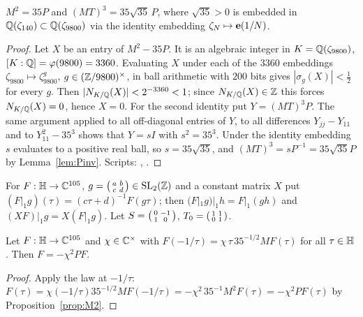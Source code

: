 \begin{proposition}\label{prop:M2}
$M^2=35P$ and $(MT)^3=35\sqrt{35}\,P$, where $\sqrt{35}>0$ is embedded in $\mathbb{Q}(\zeta_{140})\subset\mathbb{Q}(\zeta_{9800})$ via the identity embedding $\zeta_N\mapsto\mathbf{e}(1/N)$.
\end{proposition}
\begin{proof}
Let $X$ be an entry of $M^2-35P$. It is an algebraic integer in $K=\mathbb{Q}(\zeta_{9800})$, $[K:\mathbb{Q}]=\varphi(9800)=3360$. Evaluating $X$ under each of the $3360$ embeddings
$\zeta_{9800}\mapsto\zeta_{9800}^g$, $g\in(\mathbb{Z}/9800)^\times$, in ball arithmetic \cite{Arb} with $200$ bits gives $|\sigma_g(X)|<\frac12$ for every $g$. Then
$|N_{K/\mathbb{Q}}(X)|<2^{-3360}<1$; since $N_{K/\mathbb{Q}}(X)\in\mathbb{Z}$ this forces $N_{K/\mathbb{Q}}(X)=0$, hence $X=0$.
For the second identity put $Y=(MT)^3P$. The same argument applied to all off-diagonal entries of $Y$, to all differences $Y_{jj}-Y_{11}$ and to $Y_{11}^2-35^3$ shows that
$Y=sI$ with $s^2=35^3$. Under the identity embedding $s$ evaluates to a positive real ball, so $s=35\sqrt{35}$, and $(MT)^3=sP^{-1}=35\sqrt{35}P$ by Lemma~\ref{lem:Pinv}.
Scripts: , .
\end{proof}

For $F:\mathbb{H}\to\mathbb{C}^{105}$, $g=\begin{psmallmatrix}a&b\\c&d\end{psmallmatrix}\in\mathrm{SL}_2(\mathbb{Z})$ and a constant matrix $X$ put $(F|_1g)(\tau)=(c\tau+d)^{-1}F(g\tau)$; then
$(F|_1g)|_1h=F|_1(gh)$ and $(XF)|_1g=X(F|_1g)$. Let $S=\begin{psmallmatrix}0&-1\\1&0\end{psmallmatrix}$, $T_0=\begin{psmallmatrix}1&1\\0&1\end{psmallmatrix}$.

\begin{lemma}\label{lem:O}
Let $F:\mathbb{H}\to\mathbb{C}^{105}$ and $\chi\in\mathbb{C}^\times$ with $F(-1/\tau)=\chi\,\tau\,35^{-1/2}MF(\tau)$ for all $\tau\in\mathbb{H}$. Then $F=-\chi^2PF$.
\end{lemma}
\begin{proof}
Apply the law at $-1/\tau$: $F(\tau)=\chi(-1/\tau)35^{-1/2}MF(-1/\tau)=-\chi^2\,35^{-1}M^2F(\tau)=-\chi^2PF(\tau)$ by Proposition~\ref{prop:M2}.
\end{proof}

